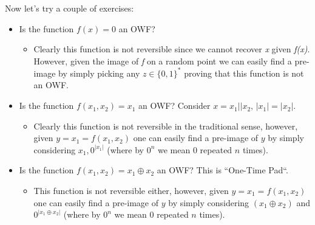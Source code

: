 \documentclass[oneside,a4paper,12pt]{book}
\begin{document}
Now let's try a couple of exercises:
\begin{itemize}

    \item Is the function \begin{math}f(x)=0\end{math} an OWF?
    
    \begin{itemize}
    
        \item Clearly this function is not reversible since we cannot recover \textit{x} given \textit{f(x)}. However,               given the image of \textit{f} on a random point we can easily find a pre-image by simply picking any $z \in \{0,1\}^*$  proving that this function is not an OWF.
        
    \end{itemize}
    
    \item Is the function \begin{math}f(x_1,x_2)=x_1\end{math} an OWF? Consider \begin{math}x=x_1||x_2\text{, } |x_1|=|x_2|\end{math}.
    
    \begin{itemize}
    
        \item Clearly this function is not reversible in the traditional sense, however, given $y=x_1=f(x_1,x_2)$ one can easily find a pre-image of $y$ by simply considering $x_1,0^{|x_1|}$ (where by $0^n$ we mean $0$ repeated $n$ times).
        
    \end{itemize}

    \item Is the function \begin{math}f(x_1,x_2)=x_1\oplus x_2\end{math} an OWF? This is ``One-Time Pad``.
    
    \begin{itemize}
    
        \item This function is not reversible either, however, given $y=x_1=f(x_1,x_2)$ one can easily find a pre-image of $y$ by simply considering $(x_1\oplus x_2)$ and $0^{|x_1\oplus x_2|}$ (where by $0^n$ we mean $0$ repeated $n$ times).
        
    \end{itemize}


\end{itemize}
\end{document}
